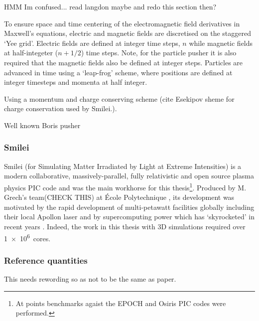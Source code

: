 HMM Im confused... read langdon maybe and redo this section then?

To ensure space and time centering of the electromagnetic field derivatives in Maxwell's equations, electric and magnetic fields are discretised on the staggered `Yee grid'. Electric fields are defined at integer time steps, $n$ while magnetic fields at half-integeter ($n + 1/2$) time steps. Note, for the particle pusher it is also required that the magnetic fields also be defined at integer steps. Particles are advanced in time using a `leap-frog' scheme, where positions are defined at integer timesteps and momenta at half integer.

Using a momentum and charge conserving scheme (cite Esekipov sheme for charge conservation used by Smilei.).

Well known Boris pusher


\subsubsection{Smilei}
Smilei (for Simulating Matter Irradiated by Light at Extreme Intensities) is a modern collaborative, massively-parallel, fully relativistic and open source plasma physics PIC code and was the main workhorse for this thesis\footnote{At points benchmarks agaist the EPOCH and Osiris PIC codes were performed.}. Produced by M. Grech's team(CHECK THIS) at École Polytechnique \cite{derouillatSmileiCollaborativeOpensource2018}, its development was motivated by the rapid development of multi-petawatt facilities globally including their local Apollon laser and by supercomputing power which has `skyrocketed' in recent years \cite{derouillatSmileiCollaborativeOpensource2018}. Indeed, the work in this thesis with 3D simulations required over \qty{1e6}{cores}.


\subsubsection{Reference quantities}
This needs rewording so as not to be the same as paper.

